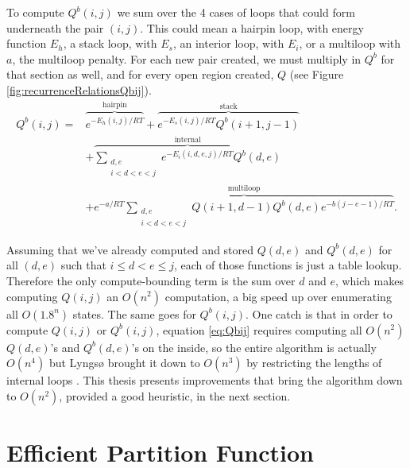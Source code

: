 To compute $Q^b(i,j)$ we sum over the 4 cases of loops that could form
underneath the pair $(i,j)$. This could mean a hairpin loop,
with energy function $E_h$, a stack loop, with $E_s$, an interior
loop, with $E_i$, or a multiloop with $a$, the multiloop penalty. For
each new pair created, we must multiply in $Q^b$ for that section as
well, and for every open region created, $Q$ (see Figure
\ref{fig:recurrenceRelationsQbij}).
\begin{equation}
\begin{split}
 Q^b(i, j) =& \overbrace{e^{-E_h(i,j)/RT}}^{\text{hairpin}} +
 \overbrace{e^{-E_s(i, j)/RT} Q^b(i+1, j-1)}^{\text{stack}} \\ 
& + \overbrace{\sum_{\substack{d,e \\ i < d< e< j}} e^{-E_i(i, d, e, j)/RT}Q^b(d,e)}^{\text{internal}} \\ 
& + \overbrace{e^{-a/RT} \sum_{\substack{d,e \\ i < d< e< j}} Q(i+1, d-1) Q^b(d,e) e^{-b(j-e-1)/RT}}^{\text{multiloop}}.
\end{split}
\label{eq:Qbij}
\end{equation}

Assuming that we've already computed and stored $Q(d,e)$ and
$Q^b(d,e)$ for all $(d,e)$ such that $ i \leq d < e \leq j$, each of
those functions is just a table lookup. Therefore the only
compute-bounding term is the sum over $d$ and $e$, which makes
computing $Q(i,j)$ an $O(n^2)$ computation, a big speed up over
enumerating all $O(1.8^n)$ states. The same goes for $Q^b(i,j)$. One
catch is that in order to compute $Q(i,j)$ or $Q^b(i,j)$, equation
\ref{eq:Qbij} requires computing all $O(n^2)$ $Q(d,e)$'s and
$Q^b(d,e)$'s on the inside, so the entire algorithm is actually
$O(n^4)$ but Lyngs{\o} brought it down to $O(n^3)$ by restricting the
lengths of internal loops \cite{lyngso2000rna}. This thesis presents
improvements that bring the algorithm down to $O(n^2)$, provided a
good heuristic, in the next section.

\section{Efficient Partition Function}

